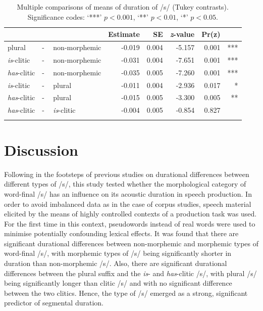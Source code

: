 \begin{table}\fontsize{10}{11}
\caption{Multiple comparisons of means of duration of /s/ (Tukey contrasts). Significance codes: `***' $p < 0.001$, `**' $p < 0.01$, `*' $p < 0.05$.}
\label{tab:4.11}
\centering
\begin{tabular}{lllrrrrr} 
\lsptoprule
~                   & ~ & ~                  & Estimate & SE    & \textit{z}-value & Pr(\textbar{}z\textbar{}) & ~    \\ 
\midrule
plural              & - & non-morphemic      & -0.019   & 0.004 & -5.157           & 
  0.001                  & ***  \\
\textit{is}-clitic  & - & non-morphemic      & -0.031   & 0.004 & -7.651           &  0.001                    & ***  \\
\textit{has}-clitic & - & non-morphemic      & -0.035   & 0.005 & -7.260           & 
  0.001                  & ***  \\
\textit{is}-clitic  & - & plural             & -0.011   & 0.004 & -2.936           & 0.017                     & *    \\
\textit{has}-clitic & - & plural             & -0.015   & 0.005 & -3.300           & 0.005                     & **   \\
\textit{has}-clitic & - & \textit{is}-clitic & -0.004   & 0.005 & -0.854           & 0.827                     & ~    \\
\lspbottomrule
\end{tabular}
\end{table}



\section{Discussion}\label{section04_4}

Following in the footsteps of previous studies on durational differences between different types of /s/, this study tested whether the morphological category of word-final /s/ has an influence on its acoustic duration in speech production. In order to avoid imbalanced data as in the case of corpus studies, speech material elicited by the means of highly controlled contexts of a production task was used. For the first time in this context, pseudowords instead of real words were used to minimise potentially confounding lexical effects. It was found that there are significant durational differences between non-morphemic and morphemic types of word-final /s/, with morphemic types of /s/ being significantly shorter in duration than non-morphemic /s/. Also, there are significant durational differences between the plural suffix and the \textit{is}- and \textit{has}-clitic /s/, with plural /s/ being significantly longer than clitic /s/ and with no significant difference between the two clitics. Hence, the type of /s/ emerged as a strong, significant predictor of segmental duration.

